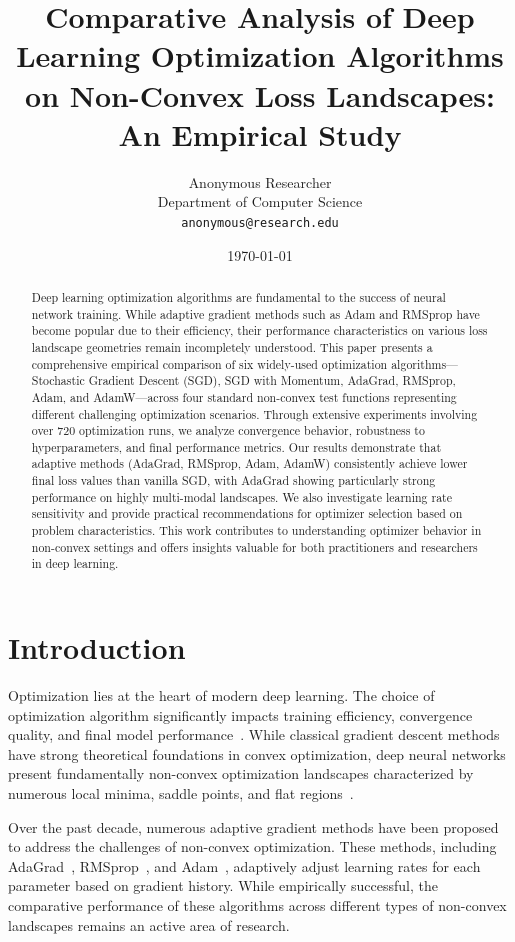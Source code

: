 \documentclass[12pt,a4paper]{article}
\title{\textbf{Comparative Analysis of Deep Learning Optimization Algorithms on Non-Convex Loss Landscapes: An Empirical Study}}
\author{
    Anonymous Researcher\\
    Department of Computer Science\\
    \texttt{anonymous@research.edu}
}
\date{\today}
\begin{document}
\maketitle

\begin{abstract}
Deep learning optimization algorithms are fundamental to the success of neural network training. While adaptive gradient methods such as Adam and RMSprop have become popular due to their efficiency, their performance characteristics on various loss landscape geometries remain incompletely understood. This paper presents a comprehensive empirical comparison of six widely-used optimization algorithms—Stochastic Gradient Descent (SGD), SGD with Momentum, AdaGrad, RMSprop, Adam, and AdamW—across four standard non-convex test functions representing different challenging optimization scenarios. Through extensive experiments involving over 720 optimization runs, we analyze convergence behavior, robustness to hyperparameters, and final performance metrics. Our results demonstrate that adaptive methods (AdaGrad, RMSprop, Adam, AdamW) consistently achieve lower final loss values than vanilla SGD, with AdaGrad showing particularly strong performance on highly multi-modal landscapes. We also investigate learning rate sensitivity and provide practical recommendations for optimizer selection based on problem characteristics. This work contributes to understanding optimizer behavior in non-convex settings and offers insights valuable for both practitioners and researchers in deep learning.
\end{abstract}

\section{Introduction}

Optimization lies at the heart of modern deep learning. The choice of optimization algorithm significantly impacts training efficiency, convergence quality, and final model performance~\cite{goodfellow2016deep}. While classical gradient descent methods have strong theoretical foundations in convex optimization, deep neural networks present fundamentally non-convex optimization landscapes characterized by numerous local minima, saddle points, and flat regions~\cite{choromanska2015loss}.

Over the past decade, numerous adaptive gradient methods have been proposed to address the challenges of non-convex optimization. These methods, including AdaGrad~\cite{duchi2011adaptive}, RMSprop~\cite{tieleman2012lecture}, and Adam~\cite{kingma2014adam}, adaptively adjust learning rates for each parameter based on gradient history. While empirically successful, the comparative performance of these algorithms across different types of non-convex landscapes remains an active area of research.
\end{document}
